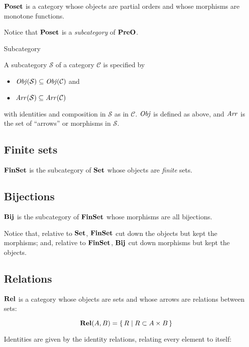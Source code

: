 $\mathbf {Poset}$ is a category whose objects are partial orders and whose morphisms
are monotone functions.

Notice that $\mathbf {Poset}$ is a \emph{subcategory} of $\mathbf {PreO}$.

\begin{framed}
  \begin{definition} Subcategory

    A subcategory $\mathcal S$ of a category $\mathcal C$ is specified by
    \begin{itemize}
    \item $\operatorname{\mathit{Obj}}(\mathcal S) \subseteq \operatorname{\mathit{Obj}}(\mathcal C)$ and
    \item $\operatorname{\mathit{Arr}}(\mathcal S) \subseteq \operatorname{\mathit{Arr}}(\mathcal C)$
    \end{itemize}
    with identities and composition in $\mathcal S$ as in $\mathcal C$. $\operatorname{\mathit{Obj}}$ is
    defined as above, and $\operatorname{\mathit{Arr}}$ is the set of ``arrows'' or morphisms in
    $\mathcal S$.
  \end{definition}
\end{framed}

\subsection{Finite sets}

$\mathbf {FinSet}$ is the subcategory of $\mathbf {Set}$ whose objects are \emph{finite}
sets.

\subsection{Bijections}

$\mathbf {Bij}$ is the subcategory of $\mathbf {FinSet}$ whose morphisms are all bijections.

Notice that, relative to $\mathbf {Set}$, $\mathbf {FinSet}$ cut down the objects but kept
the morphisms; and, relative to $\mathbf {FinSet}$, $\mathbf {Bij}$ cut down morphisms but
kept the objects.

\subsection{Relations}

$\mathbf {Rel}$ is a category whose objects are sets and whose arrows are relations
between sets:

\[\mathbf {Rel}(A, B) = \{ \, R \;|\; R \subset A \times B \, \}\]

Identities are given by the identity relations, relating every element to
itself:

